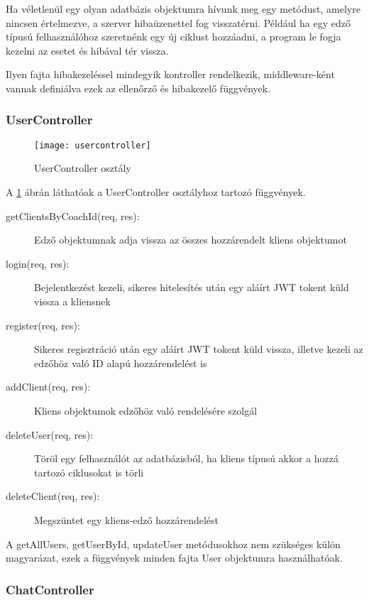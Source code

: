 Ha véletlenül egy olyan adatbázis objektumra hívunk meg egy metódust, amelyre nincsen értelmezve, a szerver hibaüzenettel fog visszatérni. Például ha egy edző típusú felhasználóhoz szeretnénk egy új ciklust hozzáadni, a program le fogja kezelni az esetet és hibával tér vissza. 

Ilyen fajta hibakezeléssel mindegyik kontroller rendelkezik, middleware-ként vannak definiálva ezek az ellenőrző és hibakezelő függvények.

\subsubsection{UserController}

\begin{figure}[H]
	\centering
	\texttt{[image: usercontroller]}
	\caption{UserController osztály}
	\label{fig:usercontroller}
\end{figure}

A \ref{fig:usercontroller} ábrán láthatóak a UserController osztályhoz tartozó függvények.

\begin{description}
	\item[getClientsByCoachId(req, res):] Edző objektumnak adja vissza az összes hozzárendelt kliens objektumot
	\item[login(req, res):] Bejelentkezést kezeli, sikeres hitelesítés után egy aláírt JWT tokent küld vissza a kliensnek
	\item[register(req, res):] Sikeres regisztráció után egy aláírt JWT tokent küld vissza, illetve kezeli az edzőhöz való ID alapú hozzárendelést is
	\item[addClient(req, res):] Kliens objektumok edzőhöz való rendelésére szolgál
	\item[deleteUser(req, res):] Töröl egy felhasználót az adatbázisból, ha kliens típusú akkor a hozzá tartozó ciklusokat is törli
	\item[deleteClient(req, res):] Megszüntet egy kliens-edző hozzárendelést
\end{description}

A getAllUsers, getUserById, updateUser metódusokhoz nem szükséges külön magyarázat, ezek a függvények minden fajta User objektumra használhatóak.

\subsubsection{ChatController}

